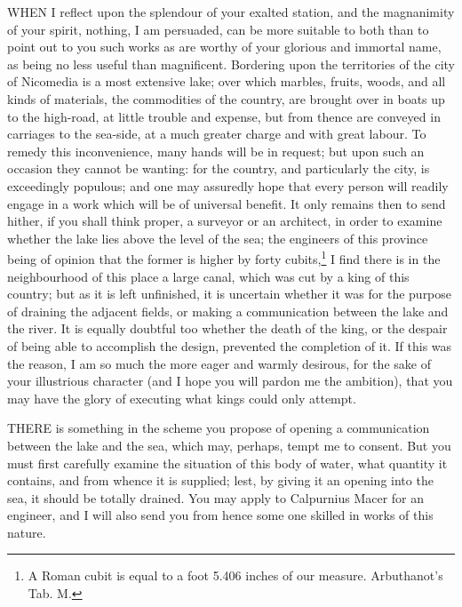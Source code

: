 
WHEN I reflect upon the splendour of your exalted station, and the
magnanimity of your spirit, nothing, I am persuaded, can be more suitable
to both than to point out to you such works as are worthy of your glorious
and immortal name, as being no less useful than magnificent. Bordering
upon the territories of the city of Nicomedia is a most extensive lake;
over which marbles, fruits, woods, and all kinds of materials, the
commodities of the country, are brought over in boats up to the high-road,
at little trouble and expense, but from thence are conveyed in carriages
to the sea-side, at a much greater charge and with great labour. To remedy
this inconvenience, many hands will be in request; but upon such an
occasion they cannot be wanting: for the country, and particularly the
city, is exceedingly populous; and one may assuredly hope that every
person will readily engage in a work which will be of universal benefit.
It only remains then to send hither, if you shall think proper, a surveyor
or an architect, in order to examine whether the lake lies above the level
of the sea; the engineers of this province being of opinion that the
former is higher by forty cubits,\footnote{A Roman cubit is
equal to a foot 5.406 inches of our measure. Arbuthanot's Tab. M.} I find there is
in the neighbourhood of this place a large canal, which was cut by a king
of this country; but as it is left unfinished, it is uncertain whether it
was for the purpose of draining the adjacent fields, or making a
communication between the lake and the river. It is equally doubtful too
whether the death of the king, or the despair of being able to accomplish
the design, prevented the completion of it. If this was the reason, I am
so much the more eager and warmly desirous, for the sake of your
illustrious character (and I hope you will pardon me the ambition), that
you may have the glory of executing what kings could only attempt.


THERE is something in the scheme you propose of opening a communication
between the lake and the sea, which may, perhaps, tempt me to consent. But
you must first carefully examine the situation of this body of water, what
quantity it contains, and from whence it is supplied; lest, by giving it
an opening into the sea, it should be totally drained. You may apply to
Calpurnius Macer for an engineer, and I will also send you from hence some
one skilled in works of this nature.

